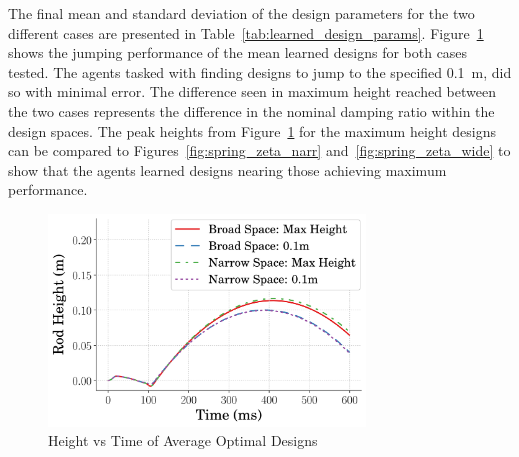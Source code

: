 The final mean and standard deviation of the design parameters for the two different cases are presented in Table~\ref{tab:learned_design_params}. Figure~\ref{fig:height_vs_time} shows the jumping performance of the mean learned designs for both cases tested. The agents tasked with finding designs to jump to the specified 0.1~m, did so with minimal error. The difference seen in maximum height reached between the two cases represents the difference in the nominal damping ratio within the design spaces. The peak heights from Figure~\ref{fig:height_vs_time} for the maximum height designs can be compared to Figures~\ref{fig:spring_zeta_narr} and~\ref{fig:spring_zeta_wide} to show that the agents learned designs nearing those achieving maximum performance. 
%
\begin{figure}[tb!]
        \centering
        \includegraphics[width=0.75\textwidth]{figures/Ch4/timeseries/TimeseriesHeight.png}  
        \caption{Height vs Time of Average Optimal Designs}
        \label{fig:height_vs_time}
\end{figure}
% 
